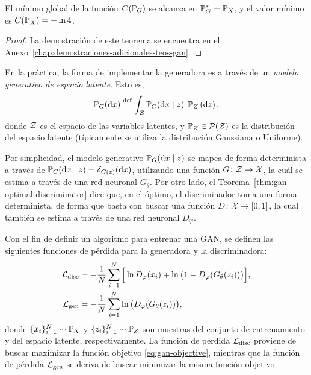 \begin{theorem}\label{thm:gan-optimal-generator}
    El mínimo global de la función $C(\Prob_G)$ se alcanza en $\Prob_G^\ast = \Prob_X$, y el valor mínimo es $C(\Prob_X) = - \ln 4$.
\end{theorem}

\begin{proof}
    La demostración de este teorema se encuentra en el Anexo~\ref{chap:demostraciones-adicionales-teos-gan}.
\end{proof}

En la práctica, la forma de implementar la generadora es a través de un \emph{modelo generativo de espacio latente}. Esto es,
\begin{equation}\label{eq:generative-model}
    \Prob_G (\dd x) \eqdef \int_\cZ \Prob_G(\dd x \mid z) \; \Prob_Z \left( \dd z\right),
\end{equation}
donde $\mathcal{Z}$ es el espacio de las variables latentes, y $\Prob_Z \in \ProbSpace[\cZ] $ es la distribución del espacio latente (típicamente se utiliza la distribución Gaussiana o Uniforme).

Por simplicidad, el modelo generativo $\Prob_G (\dd x \mid z)$ se mapea de forma determinista a través de $\Prob_G (\dd x \mid z) = \delta_{G(z)}(\dd x)$, utilizando una función $G\colon \mathcal{Z} \to \mathcal{X}$, la cuál se estima a través de una red neuronal $G_\theta$. Por otro lado, el Teorema~\ref{thm:gan-optimal-discriminator} dice que, en el óptimo, el discriminador toma una forma determinista, de forma que basta con buscar una función $D\colon\mathcal{X}\to [0, 1]$, la cual también se estima a través de una red neuronal $D_\varphi$.


Con el fin de definir un algoritmo para entrenar una GAN, se definen las siguientes funciones de pérdida para la generadora y la discriminadora:
\begin{align}
    \cL_{\mathrm{disc}} & = -\frac{1}{N}\sum_{i=1}^{N} \Big[ \ln D_\varphi(x_i) + \ln \qty\big(1 - D_\varphi(G_\theta(z_i))) \Big], \\
    \cL_{\mathrm{gen}}  & = - \frac{1}{N}\sum_{i=1}^{N} \ln \qty\big(D_\varphi(G_\theta(z_i))),
\end{align}
donde $\{x_i\}_{i=1}^{N} \sim \Prob_X$ y $\{z_i\}_{i=1}^{N} \sim \Prob_Z$ son muestras del conjunto de entrenamiento y del espacio latente, respectivamente. La función de pérdida $\mathcal{L}_{\mathrm{disc}}$ proviene de buscar maximizar la función objetivo \eqref{eq:gan-objective}, mientras que la función de pérdida $\mathcal{L}_{\mathrm{gen}}$ se deriva de buscar minimizar la misma función objetivo.

